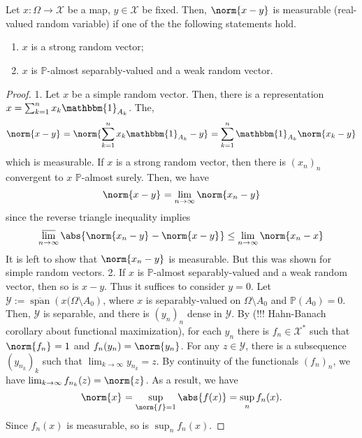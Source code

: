 \begin{lem}
  \label{normstrongvector}
    Let \( x: \Omega \to \mathcal{X} \) be a map, \( y \in \mathcal{X} \) be fixed. Then, \( \norm{x-y}_{} \) is measurable (real-valued random variable) if one of the the following statements hold.
    \begin{enumerate}[1)]
      \item \( x \) is a strong random vector;
      \item \( x \) is \( \mathbb{P} \)-almost separably-valued and a weak random vector.
    \end{enumerate}
    
\end{lem}

\begin{proof}
   1. Let \( x \) be a simple random vector. Then, there is a representation \( x= \sum_{k=1}^{n}x_k \mathbbm{1}_{A_k}\). The,
   \[ \norm{x-y}_{}= \norm{\sum_{k=1}^{n} x_k \mathbbm{1}_{A_k}-y}_{} = \sum_{k=1}^{n} \mathbbm{1}_{A_k} \norm{x_{k}-y}_{} \]
   which is measurable. If \( x \) is a strong random vector, then there is \( (x_n)_n \) convergent to \( x \) \( \mathbb{P} \)-almost surely. Then, we have
   \[ \norm{x-y}_{}= \lim_{n \to \infty} \norm{x_n-y}_{} \] 
   since the reverse triangle inequality implies
   \[ \varlimsup_{n \to \infty} \abs{ \norm{x_n-y}_{}- \norm{x-y}_{}} \leq \lim_{n \to \infty} \norm{x_n-x}_{} \]
   It is left to show that \( \norm{x_n-y}_{} \) is measurable. But this was shown for simple random vectors.
   2. If \( x \) is \( \mathbb{P} \)-almost separably-valued and a weak random vector, then so is \( x-y \). Thus it suffices to consider \( y=0 \). Let \( \mathcal{Y}:= \overline{\operatorname{span}}\left(x(\Omega \setminus A_0\right) \), where \( x \) is separably-valued on \( \Omega \setminus A_0 \) and \( \mathbb{P}(A_0)=0 \). Then, \( \mathcal{Y} \) is separable, and there is \( \left(y_n\right)_n \) dense in \( \mathcal{Y} \). By (!!! Hahn-Banach corollary about functional maximization), for each \( y_n \) there is \( f_n \in \mathcal{X}^{*} \) such that \( \norm{f_n}_{}=1 \) and \( f_n(y_n)=\norm{y_n}_{} \). For any \( z \in \mathcal{Y} \), there is a subsequence \( \left(y_{n_k}\right)_k \) such that \( \lim_{k \to \infty}y_{n_k}=z \). By continuity of the functionals \( (f_n)_n \), we have \( \lim_{k \to \infty} f_{n_k}(z)=\norm{z}_{} \). As a result, we have
     \[ \norm{x}_{}= \sup_{\norm{f}=1} \abs{f(x)}= \sup_{n} f_n(x). \]
     Since \( f_n(x) \) is measurable, so is \( \sup_{n} f_n(x) \).
\end{proof}


